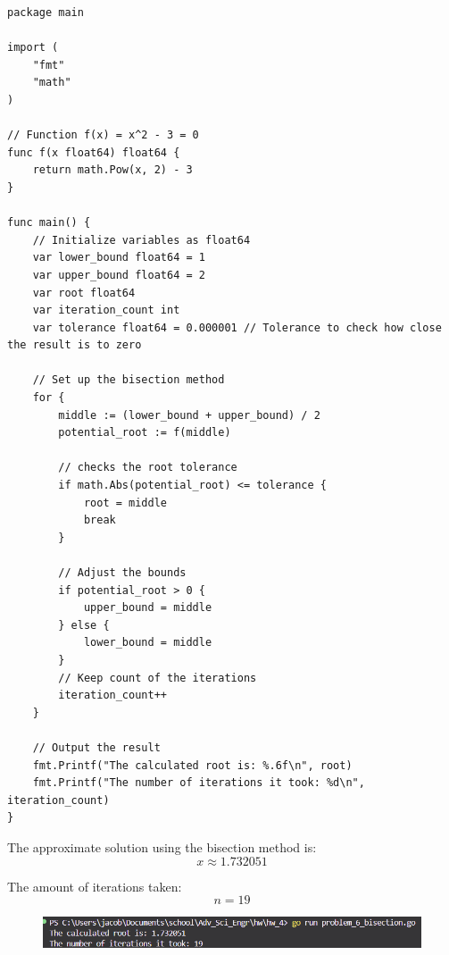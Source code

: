 \documentclass[11pt]{article}
\begin{document}
\begin{verbatim}
package main

import (
	"fmt"
	"math"
)

// Function f(x) = x^2 - 3 = 0
func f(x float64) float64 {
	return math.Pow(x, 2) - 3
}

func main() {
	// Initialize variables as float64
	var lower_bound float64 = 1
	var upper_bound float64 = 2
	var root float64
	var iteration_count int
	var tolerance float64 = 0.000001 // Tolerance to check how close the result is to zero

	// Set up the bisection method
	for {
		middle := (lower_bound + upper_bound) / 2
		potential_root := f(middle)

		// checks the root tolerance
		if math.Abs(potential_root) <= tolerance {
			root = middle
			break
		}

		// Adjust the bounds
		if potential_root > 0 {
			upper_bound = middle
		} else {
			lower_bound = middle
		}
		// Keep count of the iterations
		iteration_count++
	}

	// Output the result
	fmt.Printf("The calculated root is: %.6f\n", root)
	fmt.Printf("The number of iterations it took: %d\n", iteration_count)
}
\end{verbatim}

  The approximate solution using the bisection method is:
\[
x \approx 1.732051
\]

The amount of iterations taken:
\[
n = 19
\]

  \begin{figure}[!ht]
    \centering
    \includegraphics[width= 1 \textwidth]{images/x_3.png}
    \label{fig:1}
  \end{figure}
  \FloatBarrier
\end{document}
